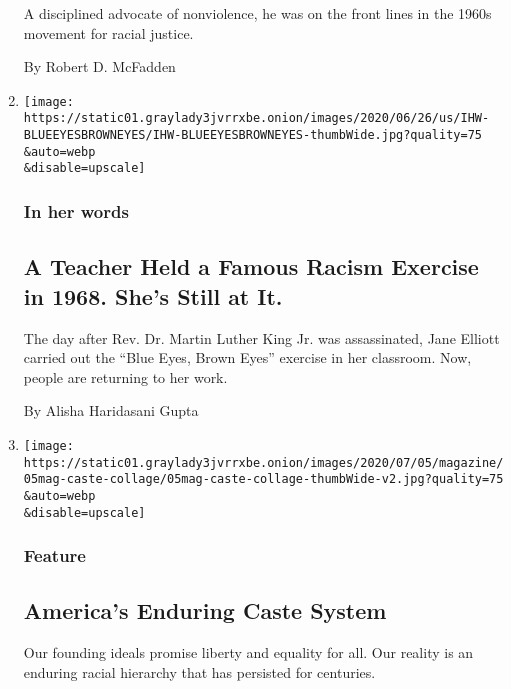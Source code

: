 \begin{enumerate}
  A disciplined advocate of nonviolence, he was on the front lines in
  the 1960s movement for racial justice.

  By Robert D. McFadden
\item
  \href{/2020/07/04/us/jane-elliott-anti-racism-blue-eyes-brown-eyes.html}{}

  \texttt{[image: https://static01.graylady3jvrrxbe.onion/images/2020/06/26/us/IHW-BLUEEYESBROWNEYES/IHW-BLUEEYESBROWNEYES-thumbWide.jpg?quality=75\\\&auto=webp\\\&disable=upscale]}

  \hypertarget{in-her-words}{%
  \subsubsection{In her words}\label{in-her-words}}

  \hypertarget{a-teacher-held-a-famous-racism-exercise-in-1968-shes-still-at-it}{%
  \subsection{A Teacher Held a Famous Racism Exercise in 1968. She's
  Still at
  It.}\label{a-teacher-held-a-famous-racism-exercise-in-1968-shes-still-at-it}}

  The day after Rev. Dr. Martin Luther King Jr. was assassinated, Jane
  Elliott carried out the ``Blue Eyes, Brown Eyes'' exercise in her
  classroom. Now, people are returning to her work.

  By Alisha Haridasani Gupta
\item
  \href{/2020/07/01/magazine/isabel-wilkerson-caste.html}{}

  \texttt{[image: https://static01.graylady3jvrrxbe.onion/images/2020/07/05/magazine/05mag-caste-collage/05mag-caste-collage-thumbWide-v2.jpg?quality=75\\\&auto=webp\\\&disable=upscale]}

  \hypertarget{feature}{%
  \subsubsection{Feature}\label{feature}}

  \hypertarget{americas-enduring-caste-system}{%
  \subsection{America's Enduring Caste
  System}\label{americas-enduring-caste-system}}

  Our founding ideals promise liberty and equality for all. Our reality
  is an enduring racial hierarchy that has persisted for centuries.


\end{enumerate}
